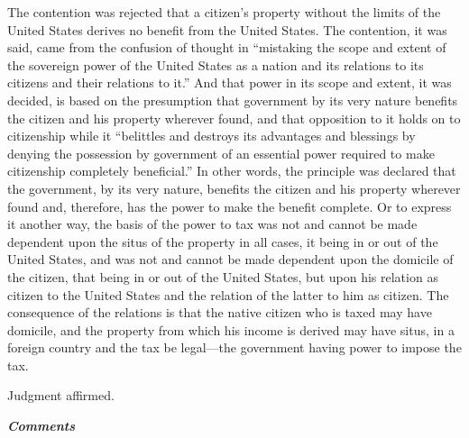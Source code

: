 \begin{select}
The contention was rejected that a citizen's property without the limits of the United States derives no benefit from the United States. The contention, it was said, came from the confusion of thought in ``mistaking the scope and extent of the sovereign power of the United States as a nation and its relations to its citizens and their relations to it.'' And that power in its scope and extent, it was decided, is based on the presumption that government by its very nature benefits the citizen and his property wherever found, and that opposition to it holds on to citizenship while it ``belittles and destroys its advantages and blessings by denying the possession by government of an essential power required to make citizenship completely beneficial.'' In other words, the principle was declared that the government, by its very nature, benefits the citizen and his property wherever found and, therefore, has the power to make the benefit complete. Or to express it another way, the basis of the power to tax was not and cannot be made dependent upon the situs of the property in all cases, it being in or out of the United States, and was not and cannot be made dependent upon the domicile of the citizen, that being in or out of the United States, but upon his relation as citizen to the United States and the relation of the latter to him as citizen. The consequence of the relations is that the native citizen who is taxed may have domicile, and the property from which his income is derived may have situs, in a foreign country and the tax be legal---the government having power to impose the tax.
 
Judgment affirmed. 
\end{select}

			\begin{center}
		\textbf{\textit{Comments}}
			\end{center}

